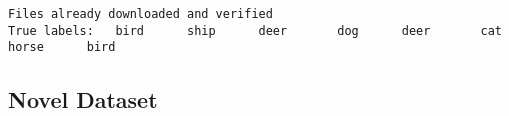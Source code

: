 \documentclass[11pt]{article}
\begin{document}
    \begin{Verbatim}[commandchars=\\\{\},fontsize=\footnotesize]
Files already downloaded and verified
True labels:   bird      ship      deer       dog      deer       cat     horse      bird

    \end{Verbatim}

    \begin{center}
    \end{center}
    
    \subsection{Novel Dataset}\label{novel-dataset}
\end{document}
